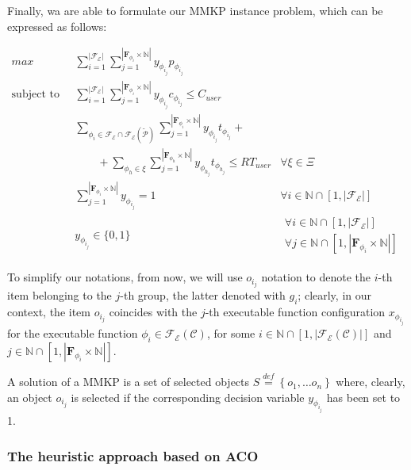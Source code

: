 \documentclass[12pt,a4paper]{report}
\newcommand{\mathDef}{\overset{\textit{def}}{=}}
\newcommand{\N}{\mathbb{N}}
\theoremstyle{definition}
\begin{document}
Finally, wa are able to formulate our MMKP instance problem, which can be expressed as follows:

\begin{align}
	\label{MMKP}
	\displaystyle max \quad & \displaystyle \sum_{i = 1}^{|\mathscr{F_E}|}  \sum_{j = 1}^{|\textbf{F}_{\phi_{i}} \times \N|} y_{\phi_{i_{j}}} p_{\phi_{i_{j}}} & \\	
	\text{subject to} \quad  & \displaystyle \sum_{i = 1}^{|\mathscr{F_E}|}  \sum_{j = 1}^{|\textbf{F}_{\phi_{i}} \times \N|} y_{\phi_{i_{j}}} c_{\phi_{i_{j}}} \leq C_{user} & \\
	& \displaystyle \sum_{\phi_i \in \mathscr{F_E} \cap \mathscr{F_E}(\mathcal{\widetilde{P}})}  \sum_{j = 1}^{|\textbf{F}_{\phi_{i}} \times \N|} y_{\phi_{i_{j}}} t_{\phi_{i_{j}}} + \nonumber \\
	& \qquad + \sum_{\phi_h \in \xi}  \sum_{j = 1}^{|\textbf{F}_{\phi_{h}} \times \N|} y_{\phi_{h_{j}}} t_{\phi_{h_{j}}} \leq RT_{user} & 
	\forall \xi \in \Xi \\	
	& \displaystyle \sum_{j = 1}^{|\textbf{F}_{\phi_{i}} \times \N|} y_{\phi_{i_{j}}} = 1 & \forall i \in \N \cap \left[ 1, |\mathscr{F_E}| \right] \\
	& y_{\phi_{i_{j}}} \in \lbrace 0, 1 \rbrace &
	\begin{array}{r}
		\forall i \in \N \cap \left[ 1, |\mathscr{F_E}| \right] \\ \forall j \in \N \cap [1,|\textbf{F}_{\phi_{i}} \times \N|]
	\end{array}
\end{align}


To simplify our notations, from now, we will use $o_{i_j}$ notation to denote the $i$-th item belonging to the $j$-th group, the latter denoted with $g_i$; clearly, in our context, the item $o_{i_j}$ coincides with the $j$-th executable function configuration $x_{\phi_{i_j}}$ for the executable function $\phi_i \in \mathscr{F_E}(\mathcal{C})$, for some $i \in \N \cap [1,|\mathscr{F_E}(\mathcal{C})|]$ and $j \in \N \cap [1,|\textbf{F}_{\phi_{i}} \times \N|]$. 

A solution of a MMKP is a set of selected objects $S \mathDef \left\{o_{1}, \ldots o_{n} \right\}$ where, clearly, an object $o_{i_j}$ is selected if the corresponding decision variable $y_{\phi_{i_j}}$ has been set to 1.


\subsubsection{The heuristic approach based on ACO}
\end{document}
